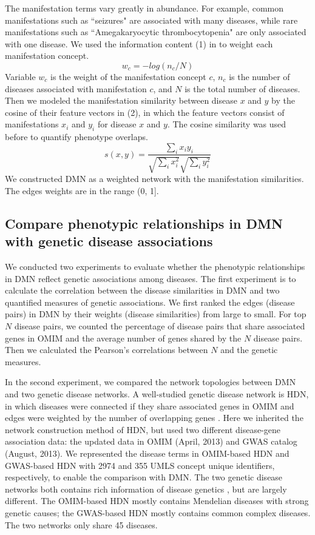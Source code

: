 The manifestation terms vary greatly in abundance.
For example, common manifestations such as ``seizures" are associated with many diseases,
while rare manifestations such as ``Amegakaryocytic thrombocytopenia" are only associated with one disease.
We used the information content (1) in to weight each manifestation concept.
\begin{equation}
w_c=-log (n_c/N) \label{ic}
\end{equation}
Variable $w_c$ is the weight of the manifestation concept $c$,
$n_c$ is the number of diseases associated with manifestation $c$,
and $N$ is the total number of diseases.
Then we modeled the manifestation similarity between disease $x$ and $y$ by
the cosine of their feature vectors in (2),
in which the feature vectors consist of manifestations $x_i$ and $y_i$ for disease $x$ and $y$.
The cosine similarity was used before \cite{lage2007human, van2006text} to quantify phenotype overlaps.
\begin{equation}
s\left( {x,y} \right) = \frac{{\mathop \sum \nolimits_i {x_i}{y_i}}}{{\sqrt {\mathop \sum \nolimits_i x_i^2} \sqrt {\mathop \sum \nolimits_i y_i^2} }} \label{cos}
\end{equation}
We constructed DMN as a weighted network with the manifestation similarities.
The edges weights are in the range (0, 1].

\subsection{Compare phenotypic relationships in DMN with genetic disease associations}
We conducted two experiments to evaluate whether
the phenotypic relationships in DMN reflect genetic associations among diseases.
The first experiment is to calculate the correlation between the disease similarities in DMN
and two quantified measures of genetic associations.
We first ranked the edges (disease pairs) in DMN by their weights (disease similarities)
from large to small.
For top $N$ disease pairs,
we counted the percentage of disease pairs that share associated genes in OMIM and
the average number of genes shared by the $N$ disease pairs.
Then we calculated the Pearson's correlations between $N$ and the genetic measures.


In the second experiment, we compared the network topologies between DMN and two genetic disease networks.
A well-studied genetic disease network is HDN, in which diseases were connected if they share associated genes in OMIM
and edges were weighted by the number of overlapping genes \cite{goh2007human}.
Here we inherited the network construction method of HDN, but used two different disease-gene association data:
the updated data in OMIM (April, 2013) and GWAS catalog (August, 2013).
We represented the disease terms in OMIM-based HDN and GWAS-based HDN with 2974 and 355 UMLS concept unique identifiers,
respectively, to enable the comparison with DMN.
The two genetic disease networks both contains rich information of disease genetics \cite{lee2013network,li2012complex},
but are largely different.
The OMIM-based HDN mostly contains Mendelian diseases with strong genetic causes;
the GWAS-based HDN mostly contains common complex diseases.
The two networks only share 45 diseases.

